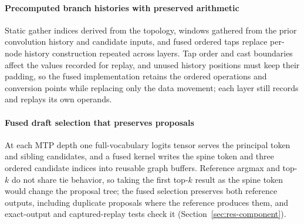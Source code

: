 \documentclass[sigconf,anonymous,review]{acmart}
\begin{document}
\paragraph{Precomputed branch histories with preserved arithmetic} Static gather indices derived from the topology, windows gathered from the prior convolution history and candidate inputs, and fused ordered taps replace per-node history construction repeated across layers. Tap order and cast boundaries affect the values recorded for replay, and unused history positions must keep their padding, so the fused implementation retains the ordered operations and conversion points while replacing only the data movement; each layer still records and replays its own operands.

\paragraph{Fused draft selection that preserves proposals} At each MTP depth one full-vocabulary logits tensor serves the principal token and sibling candidates, and a fused kernel writes the spine token and three ordered candidate indices into reusable graph buffers. Reference argmax and top-$k$ do not share tie behavior, so taking the first top-$k$ result as the spine token would change the proposal tree; the fused selection preserves both reference outputs, including duplicate proposals where the reference produces them, and exact-output and captured-replay tests check it (Section~\ref{sec:res-component}).
\end{document}
